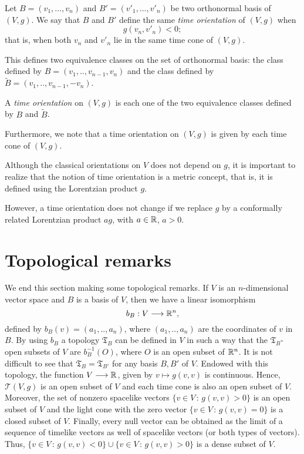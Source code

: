 Let $B = (v_1, \dots, v_n)$ and $B' = (v'_1, \dots, v'_n)$ be two orthonormal basis of $(V,g)$. We say that $B$ and $B'$ define the same \emph{time orientation} of $(V,g)$ when
\[
	g(v_n, v'_n) < 0;
\]
that is, when both $v_n$ and $v'_n$ lie in the same time cone of $(V,g)$.

This defines two equivalence classes on the set of orthonormal basis: the class defined by $B=(v_1,..,v_{n-1},v_n)$ and the class defined by $\tilde{B}=(v_1,..,v_{n-1},-v_n)$.

\begin{definition}
	\label{def:vstimeorientation}
	A \emph{time orientation} on $(V,g)$ is each one of the two equivalence classes defined by $B$ and $\tilde{B}$.
\end{definition}

Furthermore, we note that a time orientation on $(V,g)$ is given by each time cone of $(V,g)$.

Although the classical orientations on $V$ does not depend on $g$, it is important to realize that the notion of time orientation is a metric concept, that is, it is defined using the Lorentzian product $g$.

However, a time orientation does not change if we replace $g$ by a conformally related Lorentzian product $ag$, with $a\in \mathbb{R}$, $a>0$.

\section{Topological remarks}
\label{sec:toporemarks}

We end this section making some topological remarks. If $V$ is an $n$-dimensional vector space and $B$ is a basis of $V$, then we have a linear isomorphism $$b_B : V \longrightarrow \mathbb{R}^n,$$ defined by $b_B(v)=(a_1,..,a_n)$, where $(a_1,..,a_n)$ are the coordinates of $v$ in $B$. By using $b_B$ a topology $\mathfrak{T}_B$ can be defined in $V$ in such a way that the $\mathfrak{T}_B$-open subsets of $V$ are $b_B^{-1}(O)$, where $O$ is an open subset of $\mathbb{R}^n$. It is not difficult to see that $\mathfrak{T}_B = \mathfrak{T}_{B'}$ for any basis $B,B'$ of $V$. Endowed with this topology, the function $V \longrightarrow \mathbb{R}$, given by $v \mapsto g(v,v)$ is continuous. Hence, $\mathcal{T}(V,g)$ is an open subset of $V$ and each time cone is also an open subset of $V$. Moreover, the set of nonzero spacelike vectors $\{v\in V \, : \, g(v,v)>0 \}$ is an open subset of $V$ and the light cone with the zero vector $\{v\in V \, : \, g(v,v)=0 \}$ is a closed subset of $V$. Finally, every null vector can be obtained as the limit of a sequence of timelike vectors as well of spacelike vectors (or both types of vectors). Thus, $\{v\in V \, : \, g(v,v)<0 \} \cup \{v\in V \, : \, g(v,v)>0 \}$
is a dense subset of $V$.
